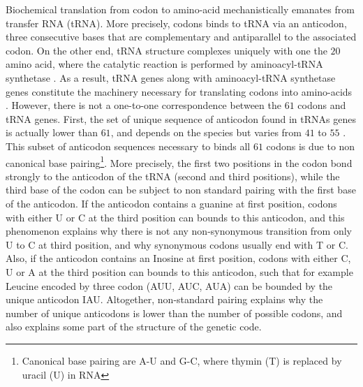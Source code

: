 Biochemical translation from \gls{codon} to amino-acid mechanistically emanates from transfer \acrshort{RNA} (\acrshort{tRNA}).
More precisely, \glspl{codon} binds to \acrshort{tRNA} via an anticodon, three consecutive bases that are complementary and antiparallel to the associated \gls{codon}.
On the other end, \acrshort{tRNA} structure complexes uniquely with one the $20$ amino acid, where the catalytic reaction is performed by aminoacyl-tRNA synthetase \citep{Rich1976}.
As a result, \acrshort{tRNA} genes along with aminoacyl-tRNA synthetase genes constitute the machinery necessary for translating \glspl{codon} into amino-acids .
However, there is not a one-to-one correspondence between the $61$ \glspl{codon} and \acrshort{tRNA} genes.
First, the set of unique sequence of anticodon found in tRNAs genes is actually lower than $61$, and depends on the species but varies from $41$ to $55$ \citep{Goodenbour2006}.
This subset of anticodon sequences necessary to binds all $61$ \glspl{codon} is due to non canonical base pairing\footnote{Canonical base pairing are A-U and G-C, where thymin (T) is replaced by uracil (U) in RNA}.
More precisely, the first two positions in the \gls{codon} bond strongly to the anticodon of the \acrshort{tRNA} (second and third positions), while the third base of the \gls{codon} can be subject to non standard pairing with the first base of the anticodon.
If the anticodon contains a guanine at first position, \glspl{codon} with either U or C at the third position can bounds to this anticodon, and this phenomenon explains why there is not any non-synonymous {transition} from only U to C at third position, and why synonymous \glspl{codon} usually end with T or C.
Also, if the anticodon contains an Inosine at first position, \glspl{codon} with either C, U or A at the third position can bounds to this anticodon, such that for example Leucine encoded by three \gls{codon} (AUU, AUC, AUA) can be bounded by the unique anticodon IAU.
Altogether, non-standard pairing explains why the number of unique anticodons is lower than the number of possible \glspl{codon}, and also explains some part of the structure of the genetic code.

